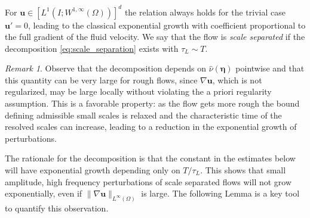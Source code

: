 \documentclass[10pt]{amsart}
\numberwithin{equation}{section}
\theoremstyle{definition}
\theoremstyle{remark}
\newtheorem{remark}[theorem]{Remark}
\renewcommand{\(}{\bigl(}
\renewcommand{\)}{\bigr)}
\newcommand{\bld}[1]{\boldsymbol{#1}}
\newcommand{\bu}{\bld{u}}
\newcommand{\bldeta}{\bld{\eta}}
\begin{document}
For $\bu \in [L^1(I;W^{1,\infty}(\Omega))]^d$ the relation always holds for the trivial case
$\bu'=0$, leading to the classical exponential growth with coefficient
proportional to the full gradient of the fluid velocity. We say that the
flow is {\em scale separated} if the decomposition
\eqref{eq:scale_separation} exists with $\tau_L  \sim T$. 
\begin{remark}
Observe that the decomposition depends on
$\hat \nu(\bldeta)$ pointwise and that this quantity can be
very large for rough flows, since $\nabla \bu$, which is not regularized,
may be large locally without violating the a priori regularity assumption. This is a favorable property: as the flow gets more
rough the bound defining admissible small scales is relaxed and the
characteristic time of the resolved scales can increase, leading to
a reduction in the exponential growth of perturbations.
\end{remark}
The rationale for the decomposition is
that the constant in the estimates below will
have exponential growth depending only on $T/\tau_L$.
This shows that small amplitude, high frequency perturbations of 
scale separated flows will not grow exponentially, even if $\|\nabla \bu\|_{L^\infty(\Omega)}$ is large. The
following Lemma is a key tool to quantify this observation.
\end{document}
